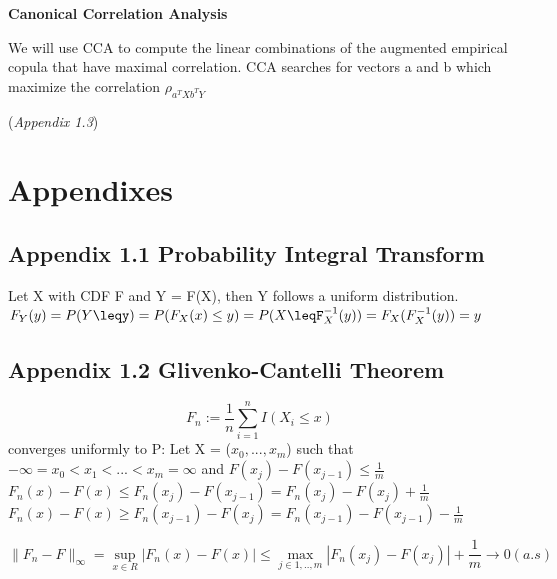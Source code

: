 \documentclass[11pt,twoside,a4paper]{article}
\begin{document}
\begin{flushleft}

\textbf{Canonical Correlation Analysis}

We will use CCA to compute the linear combinations of the augmented empirical copula that have maximal correlation.
CCA searches for vectors a and b which maximize the correlation $\rho_{a^TXb^TY}$

(\textit{Appendix 1.3})
\section*{Appendixes}
\subsection*{Appendix 1.1 Probability Integral Transform}
Let X with CDF F and Y = F(X), then Y follows a uniform distribution.
$F_{Y}(y)=P(Y\leqy)=P(F_{X}(x)\leq y) = P(X\leqF^{-1}_{X}(y)) = F_{X}(F^{-1}_{X}(y)) = y$
\subsection*{Appendix 1.2 Glivenko-Cantelli Theorem}
$$F_{n} := \frac{1}{n} \sum_{i=1}^{n} \textit{I}(X_{i} \leq x)$$ converges uniformly to P:
Let X = ($x_{0},...,x_{m}$) such that $-\infty = x_{0}<x_{1}< ... <x_{m}=\infty$ and $ F(x_{j}) - F(x_{j-1}) \leq \frac{1}{m}$
$F_{n}(x)-F(x)\leq F_{n}(x_{j})-F(x_{j-1}) = F_{n}(x_{j})-F(x_{j}) + \frac{1}{m}$
$F_{n}(x) - F(x) \geq F_{n}(x_{j-1}) -F(x_{j}) = F_{n}(x_{j-1}) -F(x_{j-1}) - \frac{1}{m}$
\end{flushleft}
$$\|F_{n} - F\|_{\infty}= \sup_{x \in R}|F_{n}(x) - F(x)| \leq \max_{j \in {1,..,m}}|F_{n}(x_{j})-F(x_{j})| + \frac{1}{m} \rightarrow 0 (a.s)$$
\end{document}

